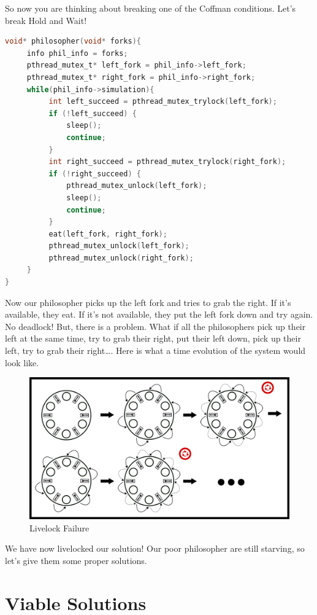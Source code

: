 So now you are thinking about breaking one of the Coffman conditions.
Let's break Hold and Wait!

\begin{lstlisting}[language=C]
void* philosopher(void* forks){
     info phil_info = forks;
     pthread_mutex_t* left_fork = phil_info->left_fork;
     pthread_mutex_t* right_fork = phil_info->right_fork;
     while(phil_info->simulation){
          int left_succeed = pthread_mutex_trylock(left_fork);
          if (!left_succeed) {
              sleep();
              continue;
          }
          int right_succeed = pthread_mutex_trylock(right_fork);
          if (!right_succeed) {
              pthread_mutex_unlock(left_fork);
              sleep();
              continue;
          }
          eat(left_fork, right_fork);
          pthread_mutex_unlock(left_fork);
          pthread_mutex_unlock(right_fork);
     }
}
\end{lstlisting}

Now our philosopher picks up the left fork and tries to grab the right.
If it's available, they eat.
If it's not available, they put the left fork down and try again.
No deadlock! But, there is a problem.
What if all the philosophers pick up their left at the same time, try to grab their right, put their left down, pick up their left, try to grab their right\ldots{}.
Here is what a time evolution of the system would look like.

\begin{figure}[H]
\centering
\includegraphics[width=.9\textwidth]{deadlock/drawings/dining_livelock.png}
\caption{Livelock Failure}
\end{figure}

We have now livelocked our solution! Our poor philosopher are still starving, so let's give them some proper solutions.

\section{Viable Solutions}

